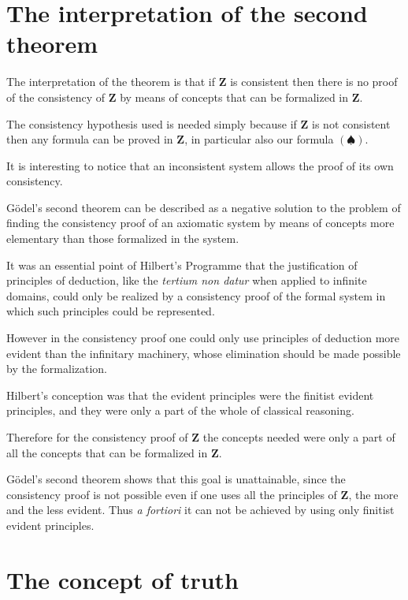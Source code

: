 \documentclass[12pt]{article}
\begin{document}
\section{The interpretation of the second theorem}\normalsize

The interpretation of the theorem is that if $\textbf{Z}$ is consistent then there is no proof of the consistency of $\textbf{Z}$ by means of concepts that can be formalized in $\textbf{Z}$.

The consistency hypothesis used is needed simply because if $\textbf{Z}$ is not consistent then any formula can be proved in $\textbf{Z}$, in particular also our formula $(\spadesuit)$. 

It is interesting to notice that an inconsistent system allows the proof of its own consistency.

G\"{o}del's second theorem can be described as a negative solution to the problem of finding the consistency proof of an axiomatic system by means of concepts more elementary than those formalized in the system.

It was an essential point of Hilbert's Programme that the justification of principles of deduction, like the \emph{tertium non datur} when applied to infinite domains, could only be realized by a consistency proof of the formal system in which such principles could be represented.

However in the consistency proof one could only use principles of deduction more evident than the infinitary machinery, whose elimination should be made possible by the formalization.

Hilbert's conception was that the evident principles were the finitist evident principles, and they were only a part of the whole of classical reasoning.

Therefore for the consistency proof of $\textbf{Z}$ the concepts needed were only a part of all the concepts that can be formalized in $\textbf{Z}$.

G\"{o}del's second theorem shows that this goal is unattainable, since the consistency proof is not possible even if one uses all the principles of $\textbf{Z}$, the more and the less evident. Thus \emph{a fortiori} it can not be achieved by using only finitist evident principles. 

\section{The concept of truth}\normalsize
\end{document}
